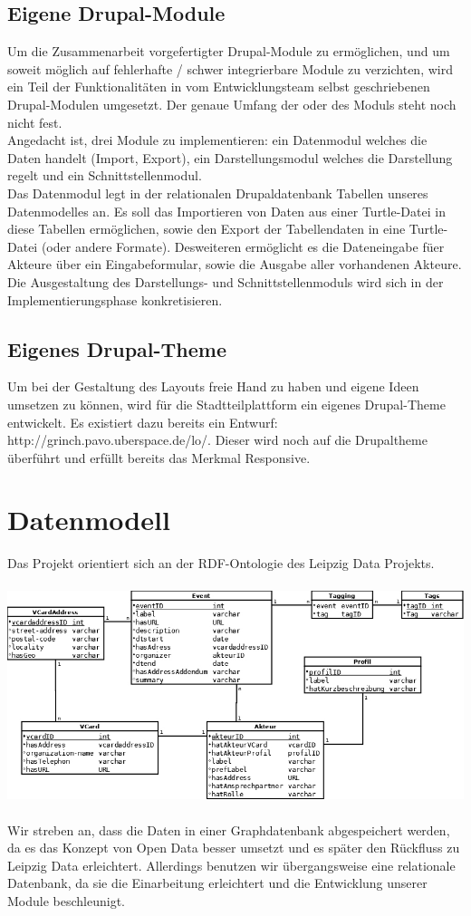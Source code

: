 \documentclass{swp}
\begin{document}
\subsection{Eigene Drupal-Module}
Um die Zusammenarbeit vorgefertigter Drupal-Module zu erm\"oglichen, und um soweit m\"oglich auf fehlerhafte / schwer integrierbare Module zu verzichten, wird ein Teil der Funktionalit\"aten in vom Entwicklungsteam selbst geschriebenen Drupal-Modulen umgesetzt. Der genaue Umfang der oder des Moduls steht noch nicht fest.\\
Angedacht ist, drei Module zu implementieren: ein Datenmodul welches die Daten handelt (Import, Export), ein Darstellungsmodul welches die Darstellung regelt und ein Schnittstellenmodul.\\
Das Datenmodul legt in der relationalen Drupaldatenbank Tabellen unseres Datenmodelles an. Es soll das Importieren von Daten aus einer Turtle-Datei in diese Tabellen erm\"oglichen, sowie den Export der Tabellendaten in eine Turtle-Datei (oder andere Formate). Desweiteren erm\"oglicht es die Dateneingabe f\"uer Akteure \"uber ein Eingabeformular, sowie die Ausgabe aller vorhandenen Akteure.\\
Die Ausgestaltung des Darstellungs- und Schnittstellenmoduls wird sich in der Implementierungsphase konkretisieren.
\subsection{Eigenes Drupal-Theme}
Um bei der Gestaltung des Layouts freie Hand zu haben und eigene Ideen umsetzen zu k\"onnen, wird f\"ur die Stadtteilplattform ein eigenes Drupal-Theme entwickelt. Es existiert dazu bereits ein Entwurf: http://grinch.pavo.uberspace.de/lo/. Dieser wird noch auf die Drupaltheme \"uberf\"uhrt und erf\"ullt bereits das Merkmal \glqq Responsive\grqq{}.
\section{Datenmodell}
Das Projekt orientiert sich an der RDF-Ontologie des Leipzig Data Projekts.\\\\
\includegraphics[width=\textwidth]{Datenmodell.jpg}\\\\
Wir streben an, dass die Daten in einer Graphdatenbank abgespeichert werden, da es das Konzept von Open Data besser umsetzt und es sp\"ater den R\"uckfluss zu Leipzig Data erleichtert. Allerdings benutzen wir \"ubergangsweise eine relationale Datenbank, da sie die Einarbeitung erleichtert und die Entwicklung unserer Module beschleunigt.
\end{document}
